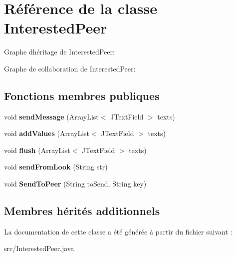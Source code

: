 \hypertarget{classInterestedPeer}{}\section{Référence de la classe Interested\+Peer}
\label{classInterestedPeer}


Graphe d\textquotesingle{}héritage de Interested\+Peer\+:


Graphe de collaboration de Interested\+Peer\+:
\subsection*{Fonctions membres publiques}
\begin{DoxyCompactItemize}
\item 
\mbox{\label{classInterestedPeer_aec04a4f1e1ea5f91bbb43f5f8ceeff98}} 
void {\bfseries send\+Message} (Array\+List$<$ J\+Text\+Field $>$ texts)
\item 
\mbox{\label{classInterestedPeer_a9af76040ca6815f1149e959f2dbf5332}} 
void {\bfseries add\+Values} (Array\+List$<$ J\+Text\+Field $>$ texts)
\item 
\mbox{\label{classInterestedPeer_aaba1ced41803a403f1bb238ad9f163c4}} 
void {\bfseries flush} (Array\+List$<$ J\+Text\+Field $>$ texts)
\item 
\mbox{\label{classInterestedPeer_afc73cfb19ded9cf3cf97ef83e189f826}} 
void {\bfseries send\+From\+Look} (String str)
\item 
\mbox{\label{classInterestedPeer_a4593deee77ff858d09f8db188dd54567}} 
void {\bfseries Send\+To\+Peer} (String to\+Send, String key)
\end{DoxyCompactItemize}
\subsection*{Membres hérités additionnels}


La documentation de cette classe a été générée à partir du fichier suivant \+:\begin{DoxyCompactItemize}
\item 
src/Interested\+Peer.\+java\end{DoxyCompactItemize}

